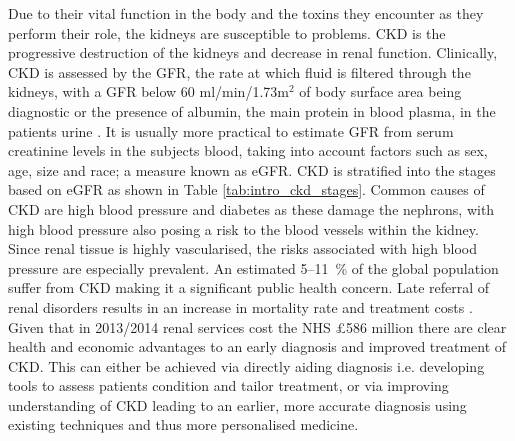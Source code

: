 Due to their vital function in the body and the toxins they encounter as they perform their role, the kidneys are susceptible to problems. \ac{CKD} is the progressive destruction of the kidneys and decrease in renal function. Clinically, \ac{CKD} is assessed by the \ac{GFR}, the rate at which fluid is filtered through the kidneys, with a \ac{GFR} below 60 ml/min/1.73m$^2$ of body surface area being diagnostic or the presence of albumin, the main protein in blood plasma, in the patients urine \cite{stevens_assessing_2006, farrugia_albumin_2010, pruijm_blood_2017}. It is usually more practical to estimate \ac{GFR} from serum creatinine levels in the subjects blood, taking into account factors such as sex, age, size and race; a measure known as \ac{eGFR}. \ac{CKD} is stratified into the stages based on \ac{eGFR} as shown in Table \ref{tab:intro_ckd_stages}. Common causes of \ac{CKD} are high blood pressure and diabetes as these damage the nephrons, with high blood pressure also posing a risk to the blood vessels within the kidney. Since renal tissue is highly vascularised, the risks associated with high blood pressure are especially prevalent. An estimated 5–11~\% of the global population suffer from \ac{CKD} \cite{coresh_prevalence_2003, de_lusignan_identifying_2005, drey_population-based_2003, amato_prevalence_2005, chadban_prevalence_2003} making it a significant public health concern. Late referral of renal disorders results in an increase in mortality rate and treatment costs \cite{jungers_late_1993, sesso_late_1996, klebe_cost_2007}. Given that in 2013/2014 renal services cost the \ac{NHS} \pounds 586 million \cite{precious_nhs_2015} there are clear health and economic advantages to an early diagnosis and improved treatment of \ac{CKD}. This can either be achieved via directly aiding diagnosis i.e. developing tools to assess patients condition and tailor treatment, or via improving understanding of \ac{CKD} leading to an earlier, more accurate diagnosis using existing techniques and thus more personalised medicine.

